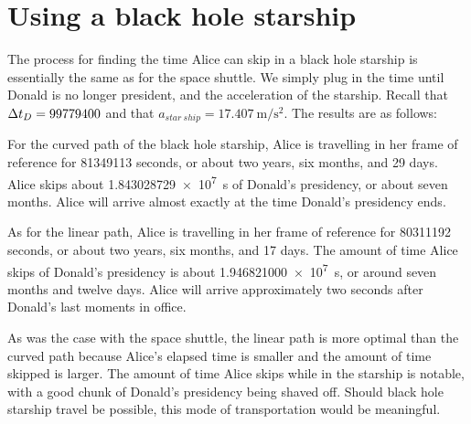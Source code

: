 \section{Using a black hole starship}
The process for finding the time Alice can skip in a black hole starship is essentially the same as for the space shuttle. We simply plug in the time until Donald is no longer president, and the acceleration of the starship. Recall that $\mathrm{\Delta} t_D = 99779400$ and that $a_{star\ ship} = \SI{17.407}{\metre/\second^2}$. The results are as follows:

For the curved path of the black hole starship, Alice is travelling in her frame of reference for \num{81349113} seconds, or about two years, six months, and 29 days. Alice skips about \SI{1.843028729e7}{\second} of Donald's presidency, or about seven months. Alice will arrive almost exactly at the time Donald's presidency ends.

As for the linear path, Alice is travelling in her frame of reference for \num{80311192} seconds, or about two years, six months, and 17 days. The amount of time Alice skips of Donald's presidency is about \SI{1.946821000e7}{\second}, or around seven months and twelve days. Alice will arrive approximately two seconds after Donald's last moments in office.

As was the case with the space shuttle, the linear path is more optimal than the curved path because Alice's elapsed time is smaller and the amount of time skipped is larger. The amount of time Alice skips while in the starship is notable, with a good chunk of Donald's presidency being shaved off. Should black hole starship travel be possible, this mode of transportation would be meaningful.
